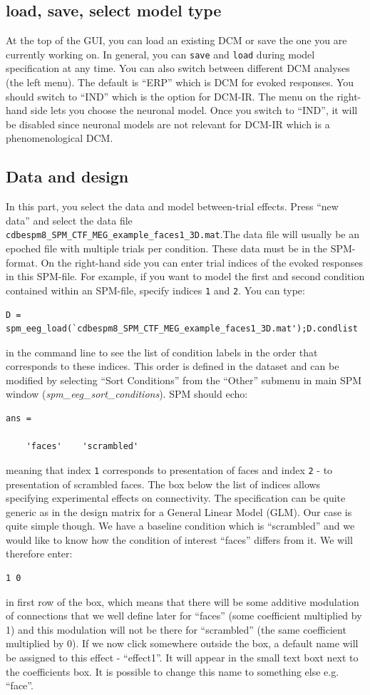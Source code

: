 \subsection{load, save, select model type}
At the top of the GUI, you can load an existing DCM or save the one you are currently working on. In general, you can \texttt{save} and \texttt{load} during model specification at any time. You can also switch between different DCM analyses (the left menu). The default is ``ERP'' which is DCM for evoked responses. You should switch to ``IND'' which is the option for DCM-IR. The menu on the right-hand side lets you choose the neuronal model. Once you switch to ``IND'', it will be disabled since neuronal models are not relevant for DCM-IR which is a phenomenological DCM.

\subsection{Data and design}
In this part, you select the data and model between-trial effects. Press ``new data'' and select the data file \texttt{cdbespm8\_\-SPM\_\-CTF\_\-MEG\_\-example\_\-faces1\_\-3D.mat}.The data file will usually be an epoched file with multiple trials per condition. These data must be in the SPM-format. On the right-hand side you can enter trial indices of the evoked responses in this SPM-file. For example, if you want to model the first and second condition contained within an SPM-file, specify
indices \texttt{1} and \texttt{2}. You can type:
\begin{verbatim}
D = spm_eeg_load(`cdbespm8_SPM_CTF_MEG_example_faces1_3D.mat');D.condlist
\end{verbatim}
in the command line to see the list of condition labels in the order that corresponds to these indices. This order is defined in the dataset and can be modified by selecting ``Sort Conditions'' from the ``Other'' submenu in main SPM window (\textit{spm\_eeg\_sort\_conditions}). SPM should echo:
\begin{verbatim}
ans = 

    'faces'    'scrambled'
\end{verbatim}
meaning that index \texttt{1} corresponds to presentation of faces and index \texttt{2} - to presentation of scrambled faces. The box below the list of indices allows specifying experimental effects on connectivity. The specification can be quite generic as in the design matrix for a General Linear Model (GLM). Our case is quite simple though. We have a baseline condition which is ``scrambled'' and we would like to know how the condition of interest ``faces'' differs from it. We will therefore enter:
\begin{verbatim}
1 0
\end{verbatim}
in first row of the box, which means that there will be some additive modulation of connections that we well define later for ``faces''  (some coefficient multiplied by 1) and this modulation will not be there for ``scrambled'' (the same coefficient multiplied by 0). If we now click somewhere outside the box, a default name will be assigned to this effect - ``effect1''. It will appear in the small text boxt next to the coefficients box. It is possible to change this name to something else e.g. ``face''.

